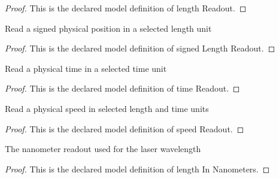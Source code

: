 \begin{proof}
  This is the declared model definition of length Readout.
\end{proof}
\begin{definition}
  \label{def:physics:phyx-mini-0124:phyxminiproblems-problemphyxmini0124-signedlengthreadout}
  Read a signed physical position in a selected length unit
\end{definition}
\begin{proof}
  This is the declared model definition of signed Length Readout.
\end{proof}
\begin{definition}
  \label{def:physics:phyx-mini-0124:phyxminiproblems-problemphyxmini0124-timereadout}
  Read a physical time in a selected time unit
\end{definition}
\begin{proof}
  This is the declared model definition of time Readout.
\end{proof}
\begin{definition}
  \label{def:physics:phyx-mini-0124:phyxminiproblems-problemphyxmini0124-speedreadout}
  Read a physical speed in selected length and time units
\end{definition}
\begin{proof}
  This is the declared model definition of speed Readout.
\end{proof}
\begin{definition}
  \label{def:physics:phyx-mini-0124:phyxminiproblems-problemphyxmini0124-lengthinnanometers}
  The nanometer readout used for the laser wavelength
\end{definition}
\begin{proof}
  This is the declared model definition of length In Nanometers.
\end{proof}
